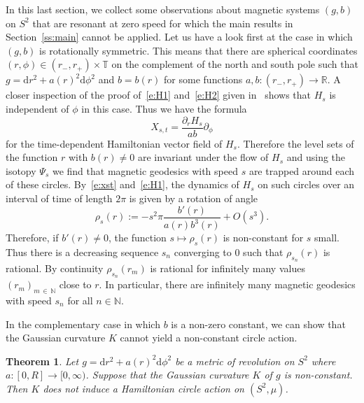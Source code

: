 \documentclass[10pt]{amsart}
\newtheorem{theo}[cdrthm]{Theorem}
\theoremstyle{definition}
\newcommand{\N}{\mathbb{N}}
\newcommand{\R}{\mathbb{R}}
\newcommand{\T}{\mathbb{T}}
\newcommand{\diff}{\mathrm{d}}
\begin{document}
In this last section, we collect some observations about magnetic systems $(g,b)$ on $S^2$ that are resonant at zero speed for which the main results in Section~\ref{ss:main} cannot be applied. Let us have a look first at the case in which $(g,b)$ is rotationally symmetric. This means that there are spherical coordinates $(r,\phi)\in(r_-,r_+)\times\T$ on the complement of the north and south pole such that $g=\diff r^2+a(r)^2\diff \phi^2$ and $b=b(r)$ for some functions $a,b:(r_-,r_+)\to\R$. A closer inspection of the proof of~\eqref{e:H1} and~\eqref{e:H2} given in~\cite[Section~3]{AB21} shows that $H_s$ is independent of $\phi$ in this case. Thus we have the formula
\begin{equation}\label{e:xst}
X_{s,t}=\frac{\partial_r H_s}{ab}\partial_\phi
\end{equation}
for the time-dependent Hamiltonian vector field of $H_s$. Therefore the level sets of the function $r$ with $b(r)\neq0$ are invariant under the flow of $H_s$ and using the isotopy $\Psi_s$ we find that magnetic geodesics with speed $s$ are trapped around each of these circles. By~\eqref{e:xst} and~\eqref{e:H1}, the dynamics of $H_s$ on such circles over an interval of time of length $2\pi$ is given by a rotation of angle
\[
\rho_s(r):=-s^2\pi \frac{b'(r)}{a(r)b^3(r)}+O(s^3).
\]
Therefore, if $b'(r)\neq0$, the function $s\mapsto \rho_s(r)$ is non-constant for $s$ small. Thus there is a decreasing sequence $s_n$ converging to $0$ such that $\rho_{s_n}(r)$ is rational. By continuity $\rho_{s_n}(r_m)$ is rational for infinitely many values $(r_m)_{m\,\in\,\N}$ close to $r$. In particular, there are infinitely many magnetic geodesics with speed $s_n$ for all $n\in\N$.

In the complementary case in which $b$ is a non-zero constant, we can show that the Gaussian curvature $K$ cannot yield a non-constant circle action.


\begin{theo}\label{thm:curvaturenonresonant}
Let $g=\diff r^2+a(r)^2\diff\phi^2$ be a metric of revolution on $S^2$ where $a:[0,R]\to[0,\infty)$. Suppose that the Gaussian curvature $K$ of $g$ is non-constant. Then $K$ does not induce a Hamiltonian circle action on $(S^2,\mu)$.
\end{theo}
\end{document}
